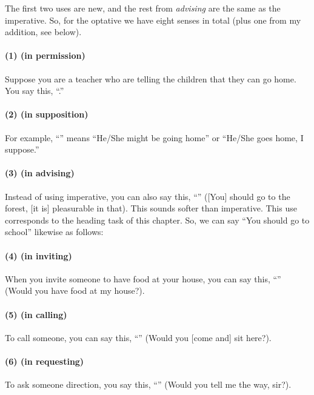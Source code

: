 The first two uses are new, and the rest from \emph{advising} are the same as the imperative. So, for the optative we have eight senses in total (plus one from my addition, see below).

\paragraph*{(1)  (in permission)} Suppose you are a teacher who are telling the children that they can go home. You say this, ``.''

\paragraph*{(2)  (in supposition)} For example, ``'' means ``He/She might be going home'' or ``He/She goes home, I suppose.''

\paragraph*{(3)  (in advising)} Instead of using imperative, you can also say this, ``'' ([You] should go to the forest, [it is] pleasurable in that). This sounds softer than imperative. This use corresponds to the heading task of this chapter. So, we can say ``You should go to school'' likewise as follows:


\paragraph*{(4)  (in inviting)} When you invite someone to have food at your house, you can say this, ``'' (Would you have food at my house?).

\paragraph*{(5)  (in calling)} To call someone, you can say this, ``'' (Would you [come and] sit here?).

\paragraph*{(6)  (in requesting)} To ask someone direction, you say this, ``'' (Would you tell me the way, sir?).

